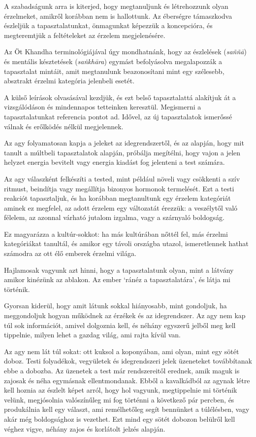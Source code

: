 A szabadságunk arra is kiterjed, hogy megtanuljunk és létrehozzunk olyan
érzelmeket, amikről korábban nem is hallottunk. Az éberségre támaszkodva
észleljük a tapasztalatunkat, önmagunkat képezzük a koncepcióra, és
megteremtjük a feltételeket az érzelem megjelenésére.

Az Öt Khandha terminológiájával úgy mondhatnánk, hogy az észlelések
(\emph{saññā}) és mentális késztetések (\emph{saṅkhāra}) egymást
befolyásolva megalapozzák a tapasztalat mintáit, amit megtanulunk
beazonosítani mint egy szélesebb, absztrakt érzelmi kategória jelenbeli
esetét.

A külső leírások olvasásával kezdjük, és ezt belső tapasztalattá
alakítjuk át a vizsgálódáson és mindennapos tetteinken keresztül.
Megismerni a tapasztalatunkat referencia pontot ad. Idővel, az új
tapasztalatok ismerőssé válnak és erőlködés nélkül megjelennek.


Az agy folyamatosan kapja a jeleket az idegrendszertől, és az alapján,
hogy mit tanult a múltbeli tapasztalatok alapján, próbálja megítélni,
hogy vajon a jelen helyzet energia bevitelt vagy energia kiadást fog
jelenteni a test számára.

Az agy válaszként felkészíti a tested, mint például növeli vagy
csökkenti a szív ritmust, beindítja vagy megállítja bizonyos hormonok
termelését. Ezt a testi reakciót tapasztaljuk, és ha korábban
megtanultunk egy érzelem kategóriát aminek ez megfelel, az adott érzelem
egy változatát érezzük: a veszélytől való félelem, az azonnal várható
jutalom izgalma, vagy a szárnyaló boldogság.

Ez magyarázza a kultúr-sokkot: ha más kultúrában nőttél fel, más érzelmi
kategóriákat tanultál, és amikor egy távoli országba utazol,
ismeretlennek hathat számodra az ott élő emberek érzelmi világa.

Hajlamosak vagyunk azt hinni, hogy a tapasztalatunk olyan, mint a
látvány amikor kinézünk az ablakon. Az ember `ránéz a tapasztalatára',
és látja mi történik.

Gyorsan kiderül, hogy amit látunk sokkal hiányosabb, mint gondoljuk, ha
meggondoljuk hogyan működnek az érzékek és az idegrendszer. Az agy nem
kap túl sok információt, amivel dolgoznia kell, és néhány egyszerű
jelből meg kell tippelnie, milyen lehet a gazdag világ, ami rajta kívül
van.

Az agy nem lát túl sokat: ott kuksol a koponyában, ami olyan, mint egy
sötét doboz. Testi folyadékok, vegyületek és idegrendszeri jelek
üzeneteket továbbítanak ebbe a dobozba. Az üzenetek a test már
rendszereitől erednek, amik maguk is zajosak és néha egymásnak
ellentmondanak. Ebből a kavalkádból az agynak létre kell hoznia az
észlelt képet arról, hogy hol vagyunk, megtippelnie mi történik velünk,
megjósolnia valószínűleg mi fog történni a következő pár percben, és
produkálnia kell egy választ, ami remélhetőleg segít bennünket a
túlélésben, vagy akár még boldogsághoz is vezethet. Ezt mind egy sötét
dobozon belülről kell véghez vigye, néhány zajos és korlátolt jelzés
alapján.


